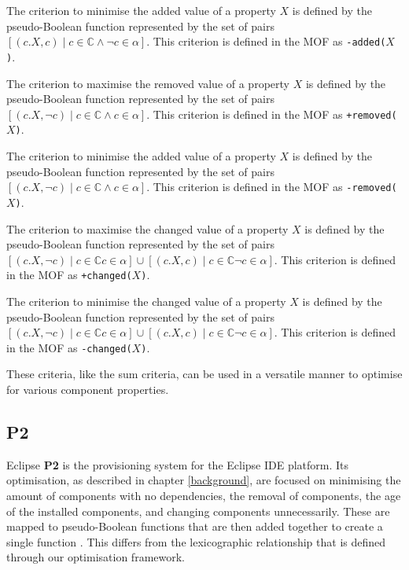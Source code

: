 \begin{defs}
The criterion to minimise the added value of a property $X$ is defined by the pseudo-Boolean function 
represented by the set of pairs $[(c.X, c) \mid c \in \mathbb{C} \wedge \neg c \in \alpha]$.
This criterion is defined in the MOF as \verb!-added(!$X$\verb+)+.
\end{defs}

\begin{defs}
The criterion to maximise the removed value of a property $X$ is defined by the pseudo-Boolean function 
represented by the set of pairs $[(c.X, \neg c) \mid c \in \mathbb{C} \wedge  c \in \alpha]$.
This criterion is defined in the MOF as \verb!+removed(!$X$\verb+)+.
\end{defs}

\begin{defs}
The criterion to minimise the added value of a property $X$ is defined by the pseudo-Boolean function 
represented by the set of pairs $[(c.X, \neg c) \mid c \in \mathbb{C} \wedge c \in \alpha]$.
This criterion is defined in the MOF as \verb!-removed(!$X$\verb+)+.
\end{defs}

\begin{defs}
The criterion to maximise the changed value of a property $X$ is defined by the pseudo-Boolean function 
represented by the set of pairs $[(c.X,\neg c) \mid c \in \mathbb{C} c \in \alpha] \cup [(c.X,c) \mid c \in \mathbb{C} \neg c \in \alpha]$.
This criterion is defined in the MOF as \verb!+changed(!$X$\verb+)+.
\end{defs}

\begin{defs}
The criterion to minimise the changed value of a property $X$ is defined by the pseudo-Boolean function 
represented by the set of pairs $[(c.X,\neg c) \mid c \in \mathbb{C} c \in \alpha] \cup [(c.X,c) \mid c \in \mathbb{C} \neg c \in \alpha]$.
This criterion is defined in the MOF as \verb!-changed(!$X$\verb+)+.
\end{defs}

These criteria, like the sum criteria, can be used in a versatile manner to optimise for various component properties.

\subsection{P2}
Eclipse \textbf{P2} \citep{le_berre_dependency_2009,leBerre2010} is the provisioning system for the Eclipse IDE platform.
Its optimisation, as described in chapter \ref{background}, are focused on minimising the amount of components with no dependencies, the removal of components,
the age of the installed components, and changing components unnecessarily.
These are mapped to pseudo-Boolean functions that are then added together to create a single function \citep{leBerre2010}.
This differs from the lexicographic relationship that is defined through our optimisation framework.

